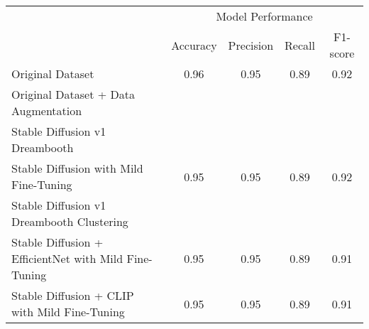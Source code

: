 \begin{table}[h]
\centering
\begin{tabular}{lcccc}
\toprule
\multirow{2}{*}{} & \multicolumn{4}{c}{Model Performance} \\
\cmidrule(lr){2-5}
  & Accuracy & Precision & Recall & F1-score \\
\midrule
Original Dataset & 0.96 & 0.95 & 0.89 & 0.92 \\
\midrule
Original Dataset + Data Augmentation &  &  &  &  \\
\midrule
Stable Diffusion v1 Dreambooth& \\
Stable Diffusion with Mild Fine-Tuning & 0.95 & 0.95 & 0.89 & 0.92  \\
\midrule
Stable Diffusion v1 Dreambooth Clustering & \\
Stable Diffusion + EfficientNet with Mild  Fine-Tuning & 0.95 & 0.95 & 0.89 & 0.91 \\
Stable Diffusion + CLIP with Mild  Fine-Tuning &  0.95 & 0.95 & 0.89 & 0.91 \\
\bottomrule
\end{tabular}
\caption{}
\label{tab:retinopatia_results_comparison}
\end{table}
